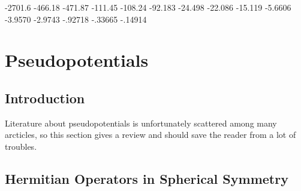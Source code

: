 -2701.6 -466.18 -471.87 -111.45 -108.24 -92.183 -24.498 -22.086 -15.119 -5.6606 -3.9570 -2.9743 -.92718 -.33665 -.14914

\section{Pseudopotentials}

\subsection{Introduction}

Literature about pseudopotentials is unfortunately scattered among many arcticles, so this section gives a review and should save the reader from a lot of troubles.

\subsection{Hermitian Operators in Spherical Symmetry}

